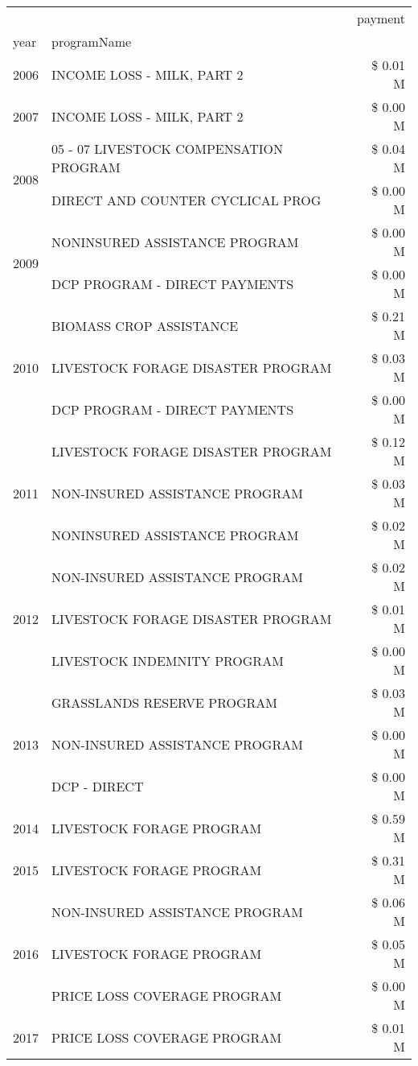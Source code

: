 \begin{tabular}{llr}
\toprule
 &  & payment \\
year & programName &  \\
\midrule
2006 & INCOME LOSS - MILK, PART 2 & \$ 0.01 M \\
\cline{1-3}
2007 & INCOME LOSS - MILK, PART 2 & \$ 0.00 M \\
\cline{1-3}
\multirow[t]{2}{*}{2008} & 05 - 07 LIVESTOCK COMPENSATION PROGRAM & \$ 0.04 M \\
 & DIRECT AND COUNTER CYCLICAL PROG & \$ 0.00 M \\
\cline{1-3}
\multirow[t]{2}{*}{2009} & NONINSURED ASSISTANCE PROGRAM & \$ 0.00 M \\
 & DCP PROGRAM - DIRECT PAYMENTS & \$ 0.00 M \\
\cline{1-3}
\multirow[t]{3}{*}{2010} & BIOMASS CROP ASSISTANCE & \$ 0.21 M \\
 & LIVESTOCK FORAGE DISASTER  PROGRAM & \$ 0.03 M \\
 & DCP PROGRAM - DIRECT PAYMENTS & \$ 0.00 M \\
\cline{1-3}
\multirow[t]{3}{*}{2011} & LIVESTOCK FORAGE DISASTER PROGRAM & \$ 0.12 M \\
 & NON-INSURED ASSISTANCE PROGRAM & \$ 0.03 M \\
 & NONINSURED ASSISTANCE PROGRAM & \$ 0.02 M \\
\cline{1-3}
\multirow[t]{3}{*}{2012} & NON-INSURED ASSISTANCE PROGRAM & \$ 0.02 M \\
 & LIVESTOCK FORAGE DISASTER PROGRAM & \$ 0.01 M \\
 & LIVESTOCK INDEMNITY PROGRAM & \$ 0.00 M \\
\cline{1-3}
\multirow[t]{3}{*}{2013} & GRASSLANDS RESERVE PROGRAM & \$ 0.03 M \\
 & NON-INSURED ASSISTANCE PROGRAM & \$ 0.00 M \\
 & DCP - DIRECT & \$ 0.00 M \\
\cline{1-3}
2014 & LIVESTOCK FORAGE PROGRAM & \$ 0.59 M \\
\cline{1-3}
2015 & LIVESTOCK FORAGE PROGRAM & \$ 0.31 M \\
\cline{1-3}
\multirow[t]{3}{*}{2016} & NON-INSURED ASSISTANCE PROGRAM                & \$ 0.06 M \\
 & LIVESTOCK FORAGE PROGRAM                      & \$ 0.05 M \\
 & PRICE LOSS COVERAGE PROGRAM                   & \$ 0.00 M \\
\cline{1-3}
2017 & PRICE LOSS COVERAGE PROGRAM & \$ 0.01 M \\

\end{tabular}
